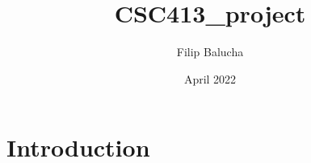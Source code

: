 \documentclass{article}
\title{CSC413_project}
\author{Filip Balucha}
\date{April 2022}
\begin{document}
\maketitle

\section{Introduction}
\end{document}
